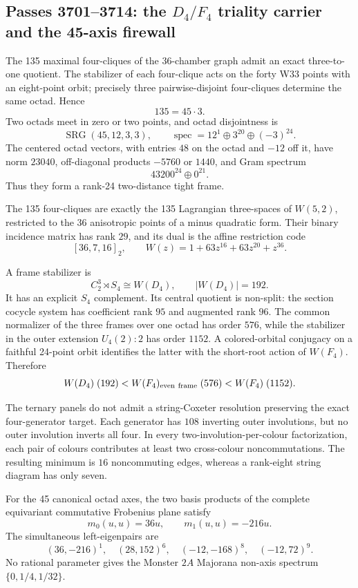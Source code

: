 \subsection{Passes 3701--3714: the \texorpdfstring{$D_4/F_4$}{D4/F4} triality carrier and the 45-axis firewall}
\label{sec:pass3701-3714}

The 135 maximal four-cliques of the 36-chamber graph admit an exact three-to-one quotient.  The stabilizer of each four-clique acts on the forty W33 points with an eight-point orbit; precisely three pairwise-disjoint four-cliques determine the same octad.  Hence
\[
135=45\cdot3.
\]
Two octads meet in zero or two points, and octad disjointness is
\[
\operatorname{SRG}(45,12,3,3),
\qquad
\operatorname{spec}=12^1\oplus3^{20}\oplus(-3)^{24}.
\]
The centered octad vectors, with entries $48$ on the octad and $-12$ off it, have norm $23040$, off-diagonal products $-5760$ or $1440$, and Gram spectrum
\[
43200^{24}\oplus0^{21}.
\]
Thus they form a rank-24 two-distance tight frame.

The 135 four-cliques are exactly the 135 Lagrangian three-spaces of $W(5,2)$, restricted to the 36 anisotropic points of a minus quadratic form.  Their binary incidence matrix has rank $29$, and its dual is the affine restriction code
\[
[36,7,16]_2,
\qquad
W(z)=1+63z^{16}+63z^{20}+z^{36}.
\]

A frame stabilizer is
\[
C_2^3\rtimes S_4\cong W(D_4),
\qquad |W(D_4)|=192.
\]
It has an explicit $S_4$ complement.  Its central quotient is non-split: the section cocycle system has coefficient rank $95$ and augmented rank $96$.  The common normalizer of the three frames over one octad has order $576$, while the stabilizer in the outer extension $U_4(2){:}2$ has order $1152$.  A colored-orbital conjugacy on a faithful 24-point orbit identifies the latter with the short-root action of $W(F_4)$.  Therefore
\[
W(D_4)\;(192)
< W(F_4)_{\rm even\ frame}\;(576)
< W(F_4)\;(1152).
\]

The ternary panels do not admit a string-Coxeter resolution preserving the exact four-generator target.  Each generator has $108$ inverting outer involutions, but no outer involution inverts all four.  In every two-involution-per-colour factorization, each pair of colours contributes at least two cross-colour noncommutations.  The resulting minimum is $16$ noncommuting edges, whereas a rank-eight string diagram has only seven.

For the 45 canonical octad axes, the two basis products of the complete equivariant commutative Frobenius plane satisfy
\[
m_0(u,u)=36u,
\qquad
m_1(u,u)=-216u.
\]
The simultaneous left-eigenpairs are
\[
(36,-216)^1,
\quad(28,152)^6,
\quad(-12,-168)^8,
\quad(-12,72)^9.
\]
No rational parameter gives the Monster $2A$ Majorana non-axis spectrum $\{0,1/4,1/32\}$.

